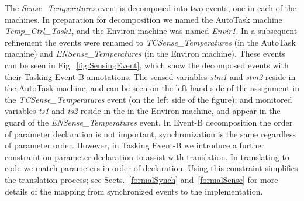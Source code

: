The \emph{Sense\_Temperatures} event is decomposed into two events, one in each of the machines. In preparation for decomposition we named the AutoTask machine \emph{Temp\_Ctrl\_Task1}, and the Environ machine was named \emph{Envir1}. In a subsequent refinement the events were renamed to \emph{TCSense\_Temperatures} (in the AutoTask machine) and \emph{ENSense\_Temperatures} (in the Environ machine). These events can be seen in Fig.~\ref{fig:SensingEvent}, which show the decomposed events with their Tasking Event-B annotations. The sensed variables \emph{stm1} and \emph{stm2} reside in the AutoTask machine, and can be seen on the left-hand side of the assignment in the \emph{TCSense\_Temperatures} event (on the left side of the figure); and monitored variables \emph{ts1} and \emph{ts2} reside in the in the Environ machine, and appear in the guard of the \emph{ENSense\_Temperatures} event. In Event-B decomposition the order of parameter declaration is not important, synchronization is the same regardless of parameter order. However, in Tasking Event-B we introduce a further constraint on parameter declaration to assist with translation. In translating to code we match parameters in order of declaration. Using this constraint simplifies the translation process; see Sects.~\ref{formalSynch} and~\ref{formalSense} for more details of the mapping from synchronized events to the implementation.
%
